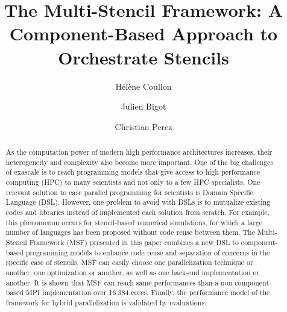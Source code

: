 \documentclass[smallextended]{svjour3}       %
\begin{document}

\title{The Multi-Stencil Framework: A Component-Based Approach to Orchestrate Stencils}
\author{H\'el\`ene Coullon \and Julien Bigot \and Christian Perez}
\maketitle
\begin{abstract}
As the computation power of modern high performance architectures increases, their heterogeneity and complexity also become more important. One of the big challenges of exascale is to reach programming models that give access to high performance computing (HPC) to many scientists and not only to a few HPC specialists. One relevant solution to ease parallel programming for scientists is Domain Specific Language (DSL). However, one problem to avoid with DSLs is to mutualize existing codes and libraries instead of implemented each solution from scratch. For example, this phenomenon occurs for stencil-based numerical simulations, for which a large number of languages has been proposed without code reuse between them. 
The Multi-Stencil Framework (MSF) presented in this paper combines a new DSL to component-based programming models to enhance code reuse and separation of concerns in the specific case of stencils. MSF can easily choose one parallelization technique or another, one optimization or another, as well as one back-end implementation or another. It is shown that MSF can reach same performances than a non component-based MPI implementation over 16.384 cores. Finally, the performance model of the framework for hybrid parallelization is validated by evaluations.

\end{abstract}
\end{document}
